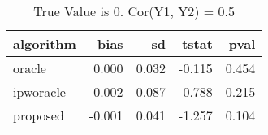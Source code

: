 \begin{table}[h!]
\caption{True Value is 0. Cor(Y1, Y2) = 0.5}
\centering
\begin{tabular}[t]{lrrrr}
\toprule
algorithm & bias & sd & tstat & pval\\
\midrule
oracle & 0.000 & 0.032 & -0.115 & 0.454\\
ipworacle & 0.002 & 0.087 & 0.788 & 0.215\\
proposed & -0.001 & 0.041 & -1.257 & 0.104\\
\bottomrule
\end{tabular}
\end{table}
